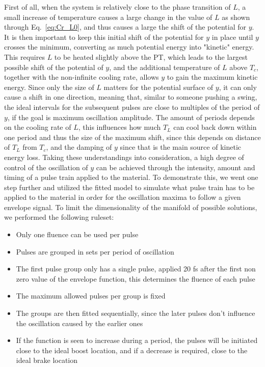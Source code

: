 First of all, when the system is relatively close to the phase transition of $L$, a small increase of temperature causes a large change in the value of $L$ as shown through Eq.~\ref{eq:Cr_L0}, and thus causes a large the shift of the potential for $y$. It is then important to keep this initial shift of the potential for $y$ in place until $y$ crosses the minimum, converting as much potential energy into "kinetic" energy. This requires $L$ to be heated slightly above the PT, which leads to the largest possible shift of the potential of $y$, and the additional temperature of $L$ above $T_c$, together with the non-infinite cooling rate, allows $y$ to gain the maximum kinetic energy. Since only the size of $L$ matters for the potential surface of $y$, it can only cause a shift in one direction, meaning that, similar to someone pushing a swing, the ideal intervals for the subsequent pulses are close to multiples of the period of $y$, if the goal is maximum oscillation amplitude.
The amount of periods depends on the cooling rate of $L$, this influences how much $T_L$ can cool back down within one period and thus the size of the maximum shift, since this depends on distance of $T_L$ from $T_c$, and the damping of $y$ since that is the main source of kinetic energy loss.
Taking these understandings into consideration, a high degree of control of the oscillation of $y$ can be achieved through the intensity, amount and timing of a pulse train applied to the material. To demonstrate this, we went one step further and utilized the fitted model to simulate what pulse train has to be applied to the material in order for the oscillation maxima to follow a given envelope signal. To limit the dimensionality of the manifold of possible solutions, we performed the following ruleset:
\begin{itemize}
	\item Only one fluence can be used per pulse
	\item Pulses are grouped in sets per period of oscillation
	\item The first pulse group only has a single pulse, applied 20 fs after the first non zero value of the envelope function, this determines the fluence of each pulse
	\item The maximum allowed pulses per group is fixed
	\item The groups are then fitted sequentially, since the later pulses don't influence the oscillation caused by the earlier ones
	\item If the function is seen to increase during a period, the pulses will be initiated close to the ideal boost location, and if a decrease is required, close to the ideal brake location
\end{itemize}

